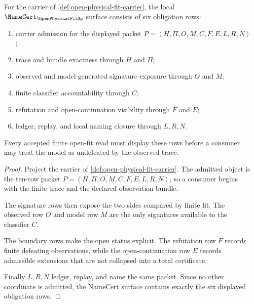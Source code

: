 \begin{theorem}
\label{thm:open-physical-fit-namecert-obligations}
For the carrier of \autoref{def:open-physical-fit-carrier}, the local $\NameCert_{\OpenPhysicalFitUp}$ surface consists of six obligation rows:
\begin{enumerate}
\item carrier admission for the displayed packet $P=(H,\Pi,O,M,C,F,E,L,R,N)$;
\item trace and bundle exactness through $H$ and $\Pi$;
\item observed and model-generated signature exposure through $O$ and $M$;
\item finite classifier accountability through $C$;
\item refutation and open-continuation visibility through $F$ and $E$;
\item ledger, replay, and local naming closure through $L,R,N$.
\end{enumerate}
Every accepted finite open-fit read must display these rows before a consumer may treat the model as undefeated by the observed trace.
\end{theorem}
\begin{proof}
Project the carrier of \autoref{def:open-physical-fit-carrier}. The admitted object is the ten-row packet $P=(H,\Pi,O,M,C,F,E,L,R,N)$, so a consumer begins with the finite trace and the declared observation bundle.

The signature rows then expose the two sides compared by finite fit. The observed row $O$ and model row $M$ are the only signatures available to the classifier $C$.

The boundary rows make the open status explicit. The refutation row $F$ records finite defeating observations, while the open-continuation row $E$ records admissible extensions that are not collapsed into a total certificate.

Finally $L,R,N$ ledger, replay, and name the same packet. Since no other coordinate is admitted, the NameCert surface contains exactly the six displayed obligation rows.
\end{proof}

